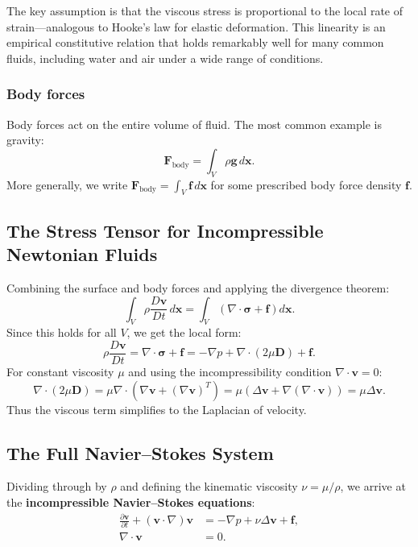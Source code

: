 The key assumption is that the viscous stress is proportional to the local rate of strain---analogous to Hooke's law for elastic deformation. This linearity is an empirical constitutive relation that holds remarkably well for many common fluids, including water and air under a wide range of conditions.

\subsubsection*{Body forces}

Body forces act on the entire volume of fluid. The most common example is gravity:
\[
\mathbf{F}_{\text{body}} = \int_V \rho \mathbf{g} \, d\mathbf{x}.
\]
More generally, we write $\mathbf{F}_{\text{body}} = \int_V \mathbf{f} \, d\mathbf{x}$ for some prescribed body force density $\mathbf{f}$.

\subsection{The Stress Tensor for Incompressible Newtonian Fluids}

Combining the surface and body forces and applying the divergence theorem:
\[
\int_V \rho \frac{D\mathbf{v}}{Dt} \, d\mathbf{x} = \int_V \left( \nabla \cdot \boldsymbol{\sigma} + \mathbf{f} \right) d\mathbf{x}.
\]
Since this holds for all $V$, we get the local form:
\[
\rho \frac{D\mathbf{v}}{Dt} = \nabla \cdot \boldsymbol{\sigma} + \mathbf{f} = -\nabla p + \nabla \cdot (2\mu \mathbf{D}) + \mathbf{f}.
\]
For constant viscosity $\mu$ and using the incompressibility condition $\nabla \cdot \mathbf{v} = 0$:
\[
\nabla \cdot (2\mu \mathbf{D}) = \mu \nabla \cdot \left( \nabla \mathbf{v} + (\nabla \mathbf{v})^T \right) = \mu \left( \Delta \mathbf{v} + \nabla(\nabla \cdot \mathbf{v}) \right) = \mu \Delta \mathbf{v}.
\]
Thus the viscous term simplifies to the Laplacian of velocity.

\subsection{The Full Navier--Stokes System}

Dividing through by $\rho$ and defining the kinematic viscosity $\nu = \mu/\rho$, we arrive at the \textbf{incompressible Navier--Stokes equations}:
\begin{equation}
\label{eq:NS}
\boxed{
\begin{aligned}
\frac{\partial \mathbf{v}}{\partial t} + (\mathbf{v} \cdot \nabla)\mathbf{v} &= -\nabla p + \nu \Delta \mathbf{v} + \mathbf{f}, \\[4pt]
\nabla \cdot \mathbf{v} &= 0.
\end{aligned}}
\end{equation}

